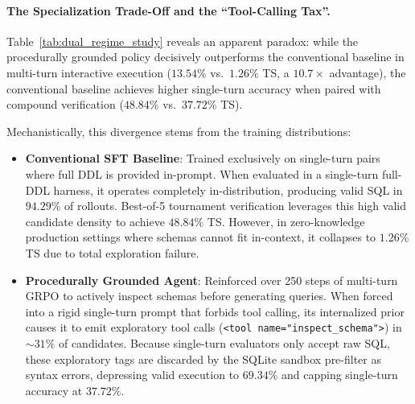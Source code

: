 \documentclass{article}
\theoremstyle{plain}
\theoremstyle{definition}
\theoremstyle{remark}
\begin{document}
\paragraph{The Specialization Trade-Off and the ``Tool-Calling Tax''.}
Table~\ref{tab:dual_regime_study} reveals an apparent paradox: while the procedurally grounded policy decisively outperforms the conventional baseline in multi-turn interactive execution ($13.54\%$ vs.\ $1.26\%$ TS, a $10.7\times$ advantage), the conventional baseline achieves higher single-turn accuracy when paired with compound verification ($48.84\%$ vs.\ $37.72\%$ TS).

Mechanistically, this divergence stems from the training distributions:
\begin{itemize}[leftmargin=*,itemsep=2pt]
    \item \textbf{Conventional SFT Baseline}: Trained exclusively on single-turn pairs where full DDL is provided in-prompt. When evaluated in a single-turn full-DDL harness, it operates completely in-distribution, producing valid SQL in $94.29\%$ of rollouts. Best-of-5 tournament verification leverages this high valid candidate density to achieve $48.84\%$ TS. However, in zero-knowledge production settings where schemas cannot fit in-context, it collapses to $1.26\%$ TS due to total exploration failure.
    \item \textbf{Procedurally Grounded Agent}: Reinforced over 250 steps of multi-turn GRPO to actively inspect schemas before generating queries. When forced into a rigid single-turn prompt that forbids tool calling, its internalized prior causes it to emit exploratory tool calls (\texttt{<tool name="inspect\_schema">}) in $\sim 31\%$ of candidates. Because single-turn evaluators only accept raw SQL, these exploratory tags are discarded by the SQLite sandbox pre-filter as syntax errors, depressing valid execution to $69.34\%$ and capping single-turn accuracy at $37.72\%$.
\end{itemize}
\end{document}
